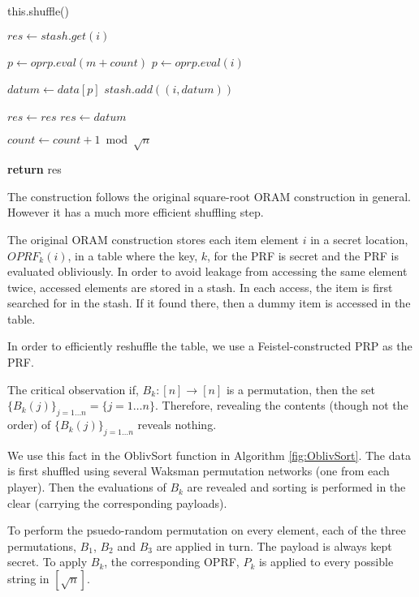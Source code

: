 \begin{algorithm}
\begin{algorithmic}[1]


    \State this.shuffle()
\EndIf

\State $res \gets stash.get(i)$

    \State $p \gets oprp.eval(m + count)$
\Else
    \State $p \gets oprp.eval(i)$
\EndIf

\State $datum \gets data[p]$
\State $stash.add((i, datum))$

    \State $res \gets res$
\Else
    \State $res \gets datum$
\EndIf

\State $count \gets count + 1 \bmod \sqrt{n}$ 

\State \textbf{return} res
\EndProcedure

\end{algorithmic}
\end{algorithm}


The construction follows the original square-root ORAM construction
\cite{ostrovsky1997private} in general. 
However it has a much more efficient shuffling step.

The original ORAM construction stores each item element $i$
in a secret location, $OPRF_k(i)$, in a table where
the key, $k$, for the PRF is secret and the PRF is evaluated obliviously.
In order to avoid leakage from accessing the same element twice,
accessed elements are stored in a stash. 
In each access, the item is first searched for in the stash.
If it found there, then a dummy item is accessed in the table.

In order to efficiently reshuffle the table, we use a Feistel-constructed
PRP as the PRF.

The critical observation if, $B_k : [n] \rightarrow [n]$ is a permutation, 
then the set $\{B_k(j) \}_{j=1 \ldots n} = \{j = 1 \ldots n\}$.
Therefore, revealing the contents (though not the order) of
$\{B_k(j)\}_{j=1 \ldots n}$ reveals nothing.

We use this fact in the OblivSort function in Algorithm \ref{fig:OblivSort}.
The data is first shuffled using several Waksman permutation networks
(one from each player).
Then the evaluations of $B_k$ are revealed and sorting is performed in the clear
(carrying the corresponding payloads).

To perform the psuedo-random permutation on every element, 
each of the three permutations, $B_1$, $B_2$ and $B_3$ are applied in turn.
The payload is always kept secret. 
To apply $B_k$, the corresponding OPRF, $P_k$ is applied to every possible string
in $[\sqrt{n}]$. 
